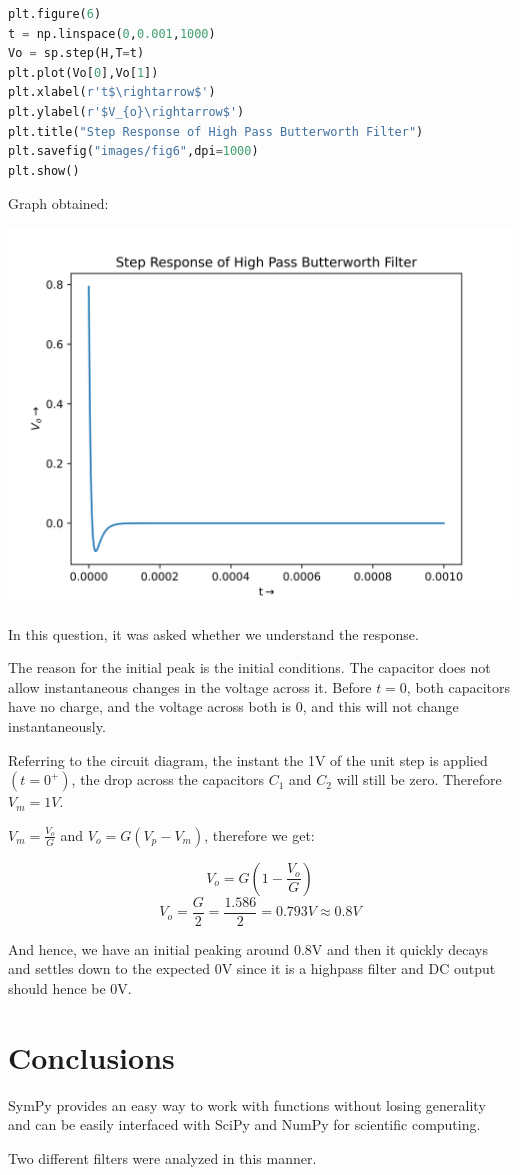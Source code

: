\documentclass[12pt]{article}
\begin{document}
\begin{lstlisting}[language=Python]
plt.figure(6)
t = np.linspace(0,0.001,1000)
Vo = sp.step(H,T=t)
plt.plot(Vo[0],Vo[1])
plt.xlabel(r't$\rightarrow$')
plt.ylabel(r'$V_{o}\rightarrow$')
plt.title("Step Response of High Pass Butterworth Filter")
plt.savefig("images/fig6",dpi=1000)
plt.show()
\end{lstlisting}
Graph obtained:
\begin{center}
    \includegraphics[scale=0.8]{images/fig6.png}
\end{center}

In this question, it was asked whether we understand the response.

The reason for the initial peak is the initial conditions. The capacitor does not allow instantaneous changes in the voltage across it. Before $t = 0$, both capacitors have no charge, and the voltage across both is 0, and this will not change instantaneously.

Referring to the circuit diagram, the instant the 1V of the unit step is applied $(t = 0^+)$, the drop across
the capacitors $C_1$ and $C_2$ will still be zero. Therefore $V_m = 1V$.

$V_m = \frac{V_o}{G}$ and $V_o = G(V_p - V_m)$, therefore we get:

$$V_o = G\left(1-\frac{V_o}{G}\right)$$
$$V_o = \frac{G}{2} = \frac{1.586}{2} = 0.793V \approx 0.8V$$

And hence, we have an initial peaking around 0.8V and then it quickly decays and settles down to the expected 0V since it is a highpass filter and DC output should hence be 0V.

\section{Conclusions}
SymPy provides an easy way to work with functions without losing generality and can be easily interfaced with SciPy and NumPy for scientific computing.

Two different filters were analyzed in this manner.
\end{document}
